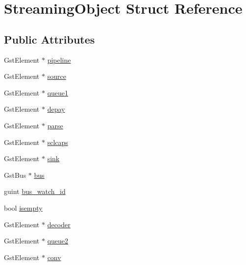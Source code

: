 \hypertarget{structStreamingObject}{}\section{Streaming\+Object Struct Reference}
\label{structStreamingObject}
\subsection*{Public Attributes}
\begin{DoxyCompactItemize}
\item 
Gst\+Element $\ast$ \mbox{\hyperlink{structStreamingObject_a8580ebdc343c6bbb3a6d18b299f9fed6}{pipeline}}
\item 
Gst\+Element $\ast$ \mbox{\hyperlink{structStreamingObject_a10849f982c00cb2f28f97b285efb899f}{source}}
\item 
Gst\+Element $\ast$ \mbox{\hyperlink{structStreamingObject_a8682d391810db4e542b04de274228468}{queue1}}
\item 
Gst\+Element $\ast$ \mbox{\hyperlink{structStreamingObject_a54988f65d0bb6b2ccbdb5f513644fa63}{depay}}
\item 
Gst\+Element $\ast$ \mbox{\hyperlink{structStreamingObject_ad5834d45738b09325ebcd60f5a78d9d3}{parse}}
\item 
Gst\+Element $\ast$ \mbox{\hyperlink{structStreamingObject_af9a01fabb57334fd63930b1c22025eba}{sclcaps}}
\item 
Gst\+Element $\ast$ \mbox{\hyperlink{structStreamingObject_a6217252f54e2bedd935665290d01a20f}{sink}}
\item 
Gst\+Bus $\ast$ \mbox{\hyperlink{structStreamingObject_a5db048e066de4ea62ec752f3ed3cf037}{bus}}
\item 
guint \mbox{\hyperlink{structStreamingObject_a82a8e52e1d7fa71e39aeec385af1cc19}{bus\+\_\+watch\+\_\+id}}
\item 
bool \mbox{\hyperlink{structStreamingObject_a88a1fb3be7b718322c3de3c39ef049ba}{isempty}}
\item 
Gst\+Element $\ast$ \mbox{\hyperlink{structStreamingObject_ad97d8f4ac856e41b43176b339988d9ac}{decoder}}
\item 
Gst\+Element $\ast$ \mbox{\hyperlink{structStreamingObject_a0d0560f361ad580b3afb0981dfdb802b}{queue2}}
\item 
Gst\+Element $\ast$ \mbox{\hyperlink{structStreamingObject_a82f32c9f5cc4900fc3dc673b9c5afe9b}{conv}}
\end{DoxyCompactItemize}


